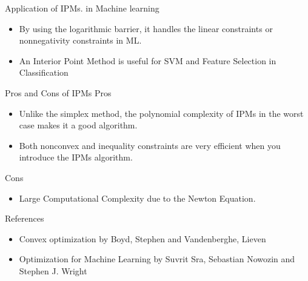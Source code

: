\documentclass{beamer}
\begin{document}

\begin{frame}[noframenumbering]{Application of IPMs. in Machine learning }
\begin{itemize}
\item By using the logarithmic barrier, it handles the linear constraints or  nonnegativity constraints in ML.
\\[0.2cm]
\item An Interior Point Method is useful for SVM and Feature Selection in Classification
\end{itemize}
\end{frame}

\begin{frame}[noframenumbering]{Pros and Cons of IPMs}
\alert{Pros}
\begin{itemize}
	\item Unlike the simplex method, the polynomial complexity of IPMs in the worst case makes it a good algorithm.
	\item Both nonconvex and inequality constraints are very efficient when you introduce the IPMs algorithm.
	
\end{itemize}

\alert{Cons}
	\begin{itemize}
	\item  Large Computational Complexity due to the Newton Equation.

\end{itemize}
\end{frame}

 

\begin{frame}[noframenumbering]{References}
\begin{itemize}
\item\alert{ Convex optimization} by Boyd, Stephen and Vandenberghe, Lieven
\item\alert{ Optimization for Machine Learning} by Suvrit Sra, Sebastian Nowozin and Stephen J. Wright
\end{itemize}
\end{frame}
\end{document}
